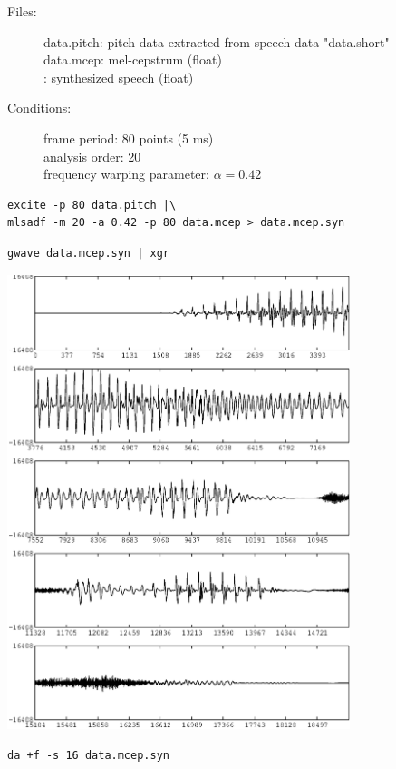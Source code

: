 \documentclass[a4paper,10pt]{article}
\begin{document}
\begin{description}
\item[Files:]
  data.pitch: pitch data extracted from speech data "data.short"\\
  data.mcep: mel-cepstrum (float) \\
  : 
  synthesized speech (float)
\item[Conditions:]
  frame period: 80 points (5 ms)\\
  analysis order: 20\\
  frequency warping parameter: $\alpha = 0.42$
\end{description}

\begin{verbatim}
excite -p 80 data.pitch |\
mlsadf -m 20 -a 0.42 -p 80 data.mcep > data.mcep.syn
\end{verbatim}

\begin{verbatim}
gwave data.mcep.syn | xgr
\end{verbatim}

\includegraphics[width=10cm]{eps/data.mcep.syn.gwave.eps}

\begin{verbatim}
da +f -s 16 data.mcep.syn
\end{verbatim}
\end{document}
